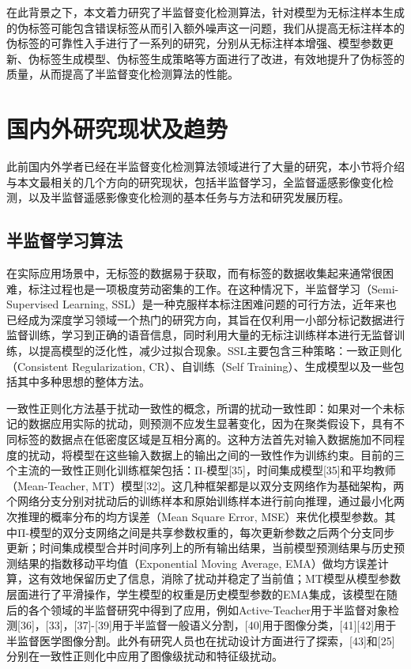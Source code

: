 \documentclass[lang=chs, degree=master, blindreview=false, adobe=false]{yanputhesis}
\begin{document}
在此背景之下，本文着力研究了半监督变化检测算法，针对模型为无标注样本生成的伪标签可能包含错误标签从而引入额外噪声这一问题，我们从提高无标注样本的伪标签的可靠性入手进行了一系列的研究，分别从无标注样本增强、模型参数更新、伪标签生成模型、伪标签生成策略等方面进行了改进，有效地提升了伪标签的质量，从而提高了半监督变化检测算法的性能。

\section{国内外研究现状及趋势}
此前国内外学者已经在半监督变化检测算法领域进行了大量的研究，本小节将介绍与本文最相关的几个方向的研究现状，包括半监督学习，全监督遥感影像变化检测，以及半监督遥感影像变化检测的基本任务与方法和研究发展历程。
\subsection{半监督学习算法}
在实际应用场景中，无标签的数据易于获取，而有标签的数据收集起来通常很困难，标注过程也是一项极度劳动密集的工作。在这种情况下，半监督学习（Semi-Supervised Learning, SSL）是一种克服样本标注困难问题的可行方法，近年来也已经成为深度学习领域一个热门的研究方向，其旨在仅利用一小部分标记数据进行监督训练，学习到正确的语音信息，同时利用大量的无标注训练样本进行无监督训练，以提高模型的泛化性，减少过拟合现象。SSL主要包含三种策略：一致正则化（Consistent Regularization, CR）、自训练（Self Training）、生成模型以及一些包括其中多种思想的整体方法。

一致性正则化方法基于扰动一致性的概念，所谓的扰动一致性即：如果对一个未标记的数据应用实际的扰动，则预测不应发生显著变化，因为在聚类假设下，具有不同标签的数据点在低密度区域是互相分离的。这种方法首先对输入数据施加不同程度的扰动，将模型在这些输入数据上的输出之间的一致性作为训练约束。目前的三个主流的一致性正则化训练框架包括：Π-模型[35]，时间集成模型[35]和平均教师（Mean-Teacher, MT）模型[32]。这几种框架都是以双分支网络作为基础架构，两个网络分支分别对扰动后的训练样本和原始训练样本进行前向推理，通过最小化两次推理的概率分布的均方误差（Mean Square Error, MSE）来优化模型参数。其中Π-模型的双分支网络之间是共享参数权重的，每次更新参数之后两个分支同步更新；时间集成模型合并时间序列上的所有输出结果，当前模型预测结果与历史预测结果的指数移动平均值（Exponential Moving Average, EMA）做均方误差计算，这有效地保留历史了信息，消除了扰动并稳定了当前值；MT模型从模型参数层面进行了平滑操作，学生模型的权重是历史模型参数的EMA集成，该模型在随后的各个领域的半监督研究中得到了应用，例如Active-Teacher用于半监督对象检测[36]，[33]，[37]-[39]用于半监督一般语义分割，[40]用于图像分类，[41][42]用于半监督医学图像分割。此外有研究人员也在扰动设计方面进行了探索，[43]和[25]分别在一致性正则化中应用了图像级扰动和特征级扰动。
\end{document}
